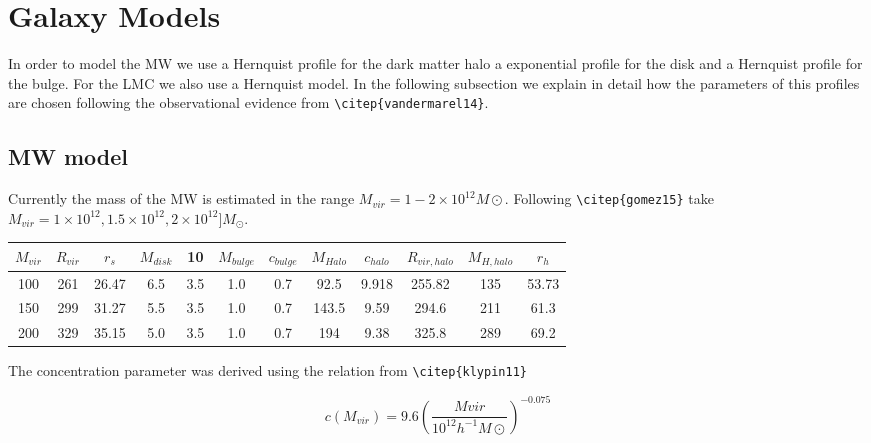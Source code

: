 \section{Galaxy Models}\label{sec:models}

In order to model the MW we use a Hernquist profile for the dark matter halo 
a exponential profile for the disk and a Hernquist profile for the bulge. For
the LMC we also use a Hernquist model. In the following subsection we explain 
in detail how the parameters of this profiles are chosen following the observational 
evidence from \verb+\citep{vandermarel14}+. 

\subsection{MW model}

Currently the mass of the MW is estimated in the range $M_{vir} = 1 - 2 \times 10 ^12 M\odot$. Following 
\verb+\citep{gomez15}+ take $M_{vir} = 1 \times 10^{12}, 1.5\times 10^{12}, 2 \times 10^{12}] M_{\odot}$.

\begin{table}[H]{\label{tab:MW}}
\begin{center}
\begin{tabular}{c c c c c c c c c c c c}
\hline
\hline
$M_{vir} $ & $R_{vir}$ & $r_s$ & $M_{disk}$ & 10 & $M_{bulge}$ & $c_{bulge} $ & $M_{Halo}$ & $c_{halo}$ & $R_{vir, halo}$ & $M_{H,halo}$ & $r_h $ \\
\hline
100 & 261 & 26.47 & 6.5 & 3.5 & 1.0 & 0.7 & 92.5 & 9.918 &  255.82 & 135 & 53.73 \\
150 & 299 & 31.27 & 5.5 & 3.5 & 1.0 & 0.7 & 143.5 & 9.59 & 294.6 & 211  & 61.3 \\
200 & 329 & 35.15 & 5.0 & 3.5 & 1.0 & 0.7 & 194 & 9.38 & 325.8 & 289 & 69.2 \\
\hline
\end{tabular}
\end{center}
\end{table}

The concentration parameter was derived using the relation from 
\verb+\citep{klypin11}+ 

\begin{equation}
c(M_{vir}) = 9.6(\dfrac{Mvir}{10^12 h^{-1} M\odot})^{-0.075}
\end{equation}

